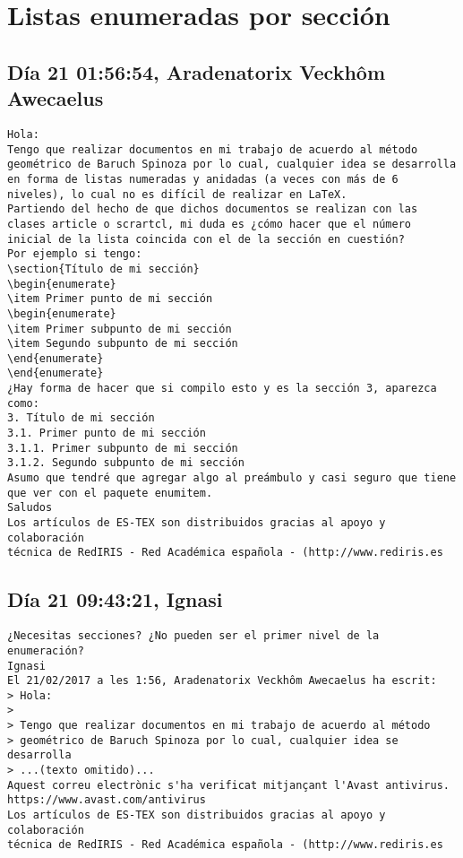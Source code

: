 \documentclass[a4paper,10pt]{article}
\begin{document}
\section{Listas enumeradas por sección}

\subsection{Día 21 01:56:54, Aradenatorix Veckhôm Awecaelus}

\begin{lstlisting}
Hola:
Tengo que realizar documentos en mi trabajo de acuerdo al método
geométrico de Baruch Spinoza por lo cual, cualquier idea se desarrolla
en forma de listas numeradas y anidadas (a veces con más de 6
niveles), lo cual no es difícil de realizar en LaTeX.
Partiendo del hecho de que dichos documentos se realizan con las
clases article o scrartcl, mi duda es ¿cómo hacer que el número
inicial de la lista coincida con el de la sección en cuestión?
Por ejemplo si tengo:
\section{Título de mi sección}
\begin{enumerate}
\item Primer punto de mi sección
\begin{enumerate}
\item Primer subpunto de mi sección
\item Segundo subpunto de mi sección
\end{enumerate}
\end{enumerate}
¿Hay forma de hacer que si compilo esto y es la sección 3, aparezca como:
3. Título de mi sección
3.1. Primer punto de mi sección
3.1.1. Primer subpunto de mi sección
3.1.2. Segundo subpunto de mi sección
Asumo que tendré que agregar algo al preámbulo y casi seguro que tiene
que ver con el paquete enumitem.
Saludos
Los artículos de ES-TEX son distribuidos gracias al apoyo y colaboración 
técnica de RedIRIS - Red Académica española - (http://www.rediris.es

\end{lstlisting}

\subsection{Día 21 09:43:21, Ignasi}

\begin{lstlisting}
¿Necesitas secciones? ¿No pueden ser el primer nivel de la enumeración?
Ignasi
El 21/02/2017 a les 1:56, Aradenatorix Veckhôm Awecaelus ha escrit:
> Hola:
>
> Tengo que realizar documentos en mi trabajo de acuerdo al método
> geométrico de Baruch Spinoza por lo cual, cualquier idea se desarrolla
> ...(texto omitido)...
Aquest correu electrònic s'ha verificat mitjançant l'Avast antivirus.
https://www.avast.com/antivirus
Los artículos de ES-TEX son distribuidos gracias al apoyo y colaboración 
técnica de RedIRIS - Red Académica española - (http://www.rediris.es

\end{lstlisting}
\end{document}
